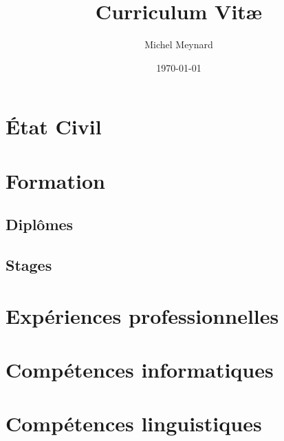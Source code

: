 \documentclass[a4paper]{article}
\title{Curriculum Vit\ae}
\author{Michel Meynard}
\date{\today}
\begin{document}
\maketitle
\section{État Civil}
\section{Formation}
\subsection{Diplômes}
\subsection{Stages}
\section{Expériences professionnelles}
\section*{Compétences informatiques}
\section*{Compétences linguistiques}
\end{document}
